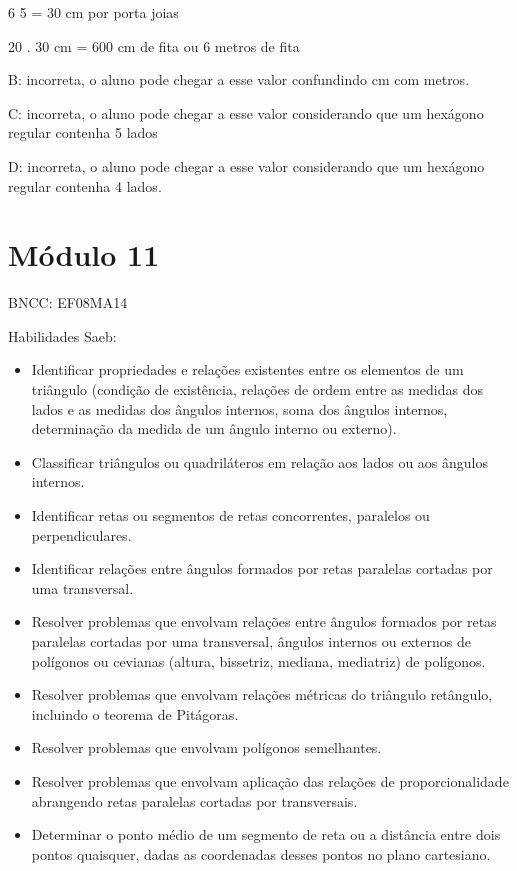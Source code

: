 \num{6} 5 = 30 cm por porta joias

20 . 30 cm = 600 cm de fita ou 6 metros de fita

B: incorreta, o aluno pode chegar a esse valor confundindo cm com
metros.

C: incorreta, o aluno pode chegar a esse valor considerando que um
hexágono regular contenha 5 lados

D: incorreta, o aluno pode chegar a esse valor considerando que um
hexágono regular contenha 4 lados.

\section{Módulo 11}

BNCC: EF08MA14

Habilidades Saeb:

\begin{itemize}
\item
  Identificar propriedades e relações existentes entre os elementos de
  um triângulo (condição de existência, relações de ordem entre as
  medidas dos lados e as medidas dos ângulos internos, soma dos ângulos
  internos, determinação da medida de um ângulo interno ou externo).
\item
  Classificar triângulos ou quadriláteros em relação aos lados ou aos
  ângulos internos.
\item
  Identificar retas ou segmentos de retas concorrentes, paralelos ou
  perpendiculares.
\item
  Identificar relações entre ângulos formados por retas paralelas
  cortadas por uma transversal.
\item
  Resolver problemas que envolvam relações entre ângulos formados por
  retas paralelas cortadas por uma transversal, ângulos internos ou
  externos de polígonos ou cevianas (altura, bissetriz, mediana,
  mediatriz) de polígonos.
\item
  Resolver problemas que envolvam relações métricas do triângulo
  retângulo, incluindo o teorema de Pitágoras.
\item
  Resolver problemas que envolvam polígonos semelhantes.
\item
  Resolver problemas que envolvam aplicação das relações de
  proporcionalidade abrangendo retas paralelas cortadas por
  transversais.
\item
  Determinar o ponto médio de um segmento de reta ou a distância entre
  dois pontos quaisquer, dadas as coordenadas desses pontos no plano
  cartesiano.
\end{itemize}

